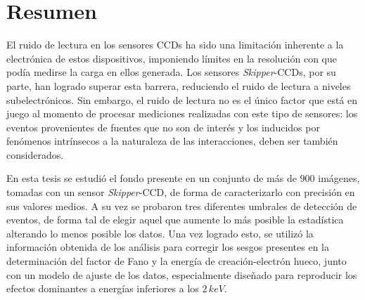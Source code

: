 \newpage
\chapter*{Resumen}
\thispagestyle{empty}
\noindent El ruido de lectura en los sensores CCDs ha sido una limitación inherente a la electrónica de estos dispositivos, imponiendo límites en la resolución con que podía medirse la carga en ellos generada. Los sensores \textit{Skipper}-CCDs, por su parte, han logrado superar esta barrera, reduciendo el ruido de lectura a niveles subelectrónicos. Sin embargo, el ruido de lectura no es el único factor que está en juego al momento de procesar mediciones realizadas con este tipo de sensores: los eventos provenientes de fuentes que no son de interés y los inducidos por fenómenos intrínsecos a la naturaleza de las interacciones, deben ser también considerados.


En esta tesis se estudió el fondo presente en un conjunto de más de $900$ imágenes, tomadas con un sensor \textit{Skipper}-CCD, de forma de caracterizarlo con precisión en sus valores medios. A su vez se probaron tres diferentes umbrales de detección de eventos, de forma tal de elegir aquel que aumente lo más posible la estadística alterando lo menos posible los datos. Una vez logrado esto, se utilizó la información obtenida de los análisis para corregir los sesgos presentes en la determinación del factor de Fano y la energía de creación-electrón hueco, junto con un modelo de ajuste de los datos, especialmente diseñado para reproducir los efectos dominantes a energías inferiores a los $2\,\si{keV}$.


